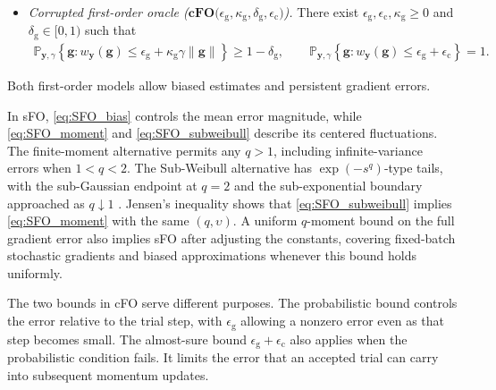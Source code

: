 \documentclass{article}
\begin{document}
\begin{assumption}
\begin{itemize}
\item
\emph{Corrupted first-order oracle (\(\textbf{cFO}\textbf{(}\epsilon_{\mathrm{g}},\kappa_{\mathrm{g}},\delta_{\mathrm{g}},\epsilon_{\mathrm{c}} \textbf{)}\)).}
There exist
\(\epsilon_{\mathrm{g}},\epsilon_{\mathrm{c}},\kappa_{\mathrm{g}}\ge0\) and
\(\delta_{\mathrm{g}}\in[0,1)\) such that
\begin{equation}\label{eq:CFO}
\begin{aligned}
\mathbb P_{\bm{y},\gamma}\!\left\{
\bm{g}:w_{\bm{y}}(\bm{g})\le\epsilon_{\mathrm{g}}+\kappa_{\mathrm{g}}\gamma\|\bm{g}\|
\right\}
\ge1-\delta_{\mathrm{g}},\qquad
\mathbb P_{\bm{y},\gamma}\!\left\{
\bm{g}:w_{\bm{y}}(\bm{g})\le\epsilon_{\mathrm{g}}+\epsilon_{\mathrm{c}}
\right\}
=1.
\end{aligned}
\end{equation}
\end{itemize}
\end{assumption}

\begin{remark}
\label{rem:FO_interpretation}
Both first-order models allow biased estimates and persistent gradient errors. 

In sFO, \eqref{eq:SFO_bias} controls the mean error magnitude, while
\eqref{eq:SFO_moment} and \eqref{eq:SFO_subweibull} describe its centered fluctuations. The finite-moment alternative permits any $q>1$, including infinite-variance errors when $1<q<2$. The Sub-Weibull alternative has $\exp(-s^q)$-type tails, with the sub-Gaussian endpoint at $q=2$ and the sub-exponential boundary approached as $q\downarrow1$ \cite{vladimirova2020subweibull}.
Jensen's inequality shows that \eqref{eq:SFO_subweibull}
implies \eqref{eq:SFO_moment} with the same \((q,\upsilon)\). A uniform $q$-moment bound on the full gradient error also implies sFO after adjusting the constants, covering fixed-batch stochastic gradients and biased approximations whenever this bound holds uniformly.

The two bounds in cFO serve different purposes. The probabilistic bound controls the error relative to the trial step, with $\epsilon_{\mathrm g}$ allowing a nonzero error even as that step becomes small. The almost-sure bound $\epsilon_{\mathrm g}+\epsilon_{\mathrm c}$ also applies when the probabilistic condition fails. It limits the error that an accepted trial can carry into subsequent momentum updates.
\end{remark}
\end{document}
